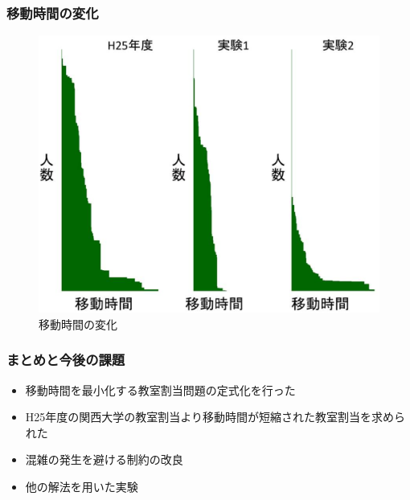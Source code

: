 \documentclass[dvipdfmx,12pt]{beamer}
\begin{document}
\begin{frame}
 \frametitle{\LARGE 移動時間の変化}
\begin{figure}[htpb]
 \begin{center}
  \includegraphics[scale=0.25]{giyou_picture1.eps}
\vspace{-2.0mm}
  \caption{移動時間の変化}
  \label{fig:1}
 \end{center}
\end{figure}
\end{frame}

\begin{frame}
 \frametitle{\LARGE まとめと今後の課題}
\begin{itemize}
  \item {\Large 移動時間を最小化する教室割当問題の定式化を行った}
  \item {\Large H25年度の関西大学の教室割当より移動時間が短縮された教室割当を求められた}
\end{itemize}


\begin{itemize}
  \item {\Large 混雑の発生を避ける制約の改良}
  \item {\Large 他の解法を用いた実験}
\end{itemize}
\end{frame}
\end{document}
